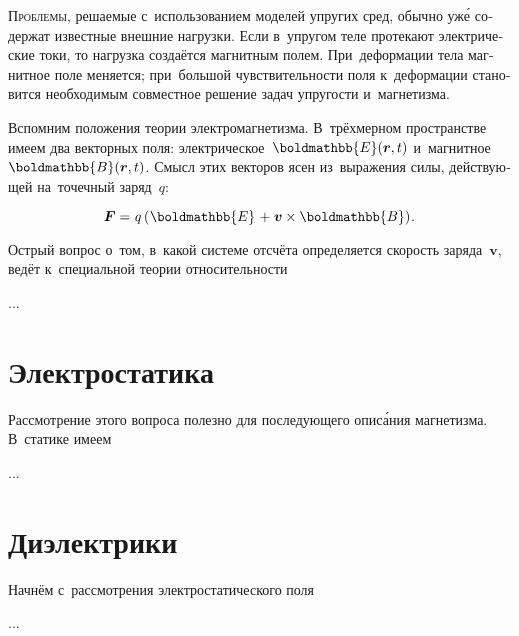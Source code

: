 \begin{otherlanguage}{russian}

\lettrine[lines=2, findent=2pt, nindent=0pt]{П}{роблемы}, решаемые с~использованием моделей упругих сред, обычно уж\'{е} содержат известные внешние нагрузки. %
Если в~упругом теле протекают электрические токи, то нагрузка создаётся магнитным полем. При~деформации тела магнитное поле меняется; при~большой чувствительности поля к~деформации становится необходимым совместное решение задач упругости и~магнетизма.

Вспомним положения теории электромагнетизма. В~трёхмерном пространстве имеем два векторных поля: электрическое~${\boldmathbb{E}(\bm{r},t)}$ и~магнитное~${\boldmathbb{B}(\bm{r},t)}$. Смысл этих векторов ясен из~выражения силы, действующей на~точечный заряд~$q$:

\nopagebreak\vspace{-0.1em}\begin{equation}
\bm{F} = \hspace{.12ex} q \left( \hspace{.1ex} \boldmathbb{E} \hspace{.2ex} + \hspace{.1ex} \bm{v} \times \boldmathbb{B} \right) \hspace{-0.25ex}.
\end{equation}

\vspace{-0.1em} Острый вопрос о~том, в~какой системе отсчёта определяется скорость заряда~$\bm{v}$, ведёт к~специальной теории относительности

...



\section{Электростатика}

Рассмотрение этого вопроса полезно для последующего опис\'{а}ния магнетизма. В~статике имеем

...



\section{Диэлектрики}

Начнём с~рассмотрения электростатического поля

...




\end{otherlanguage}
